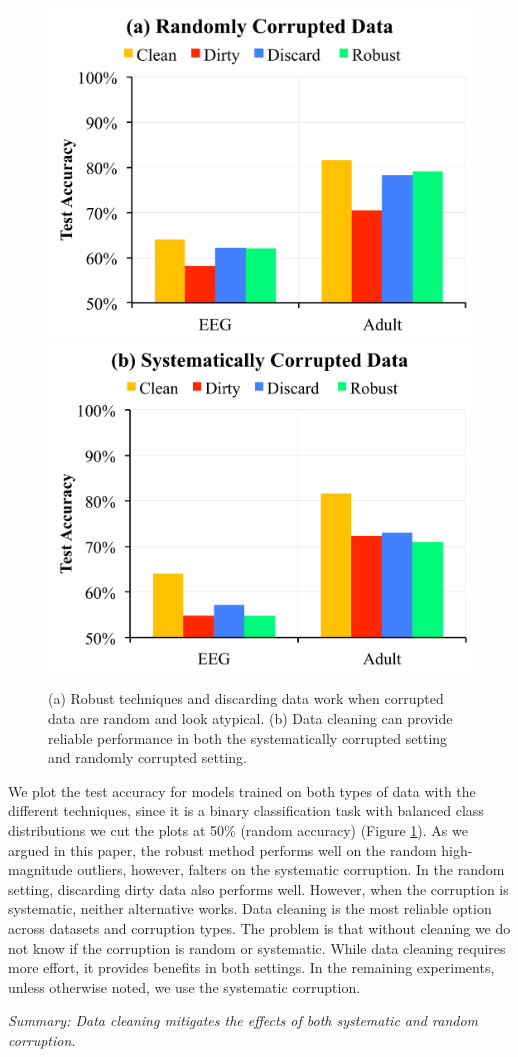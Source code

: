 \begin{figure}[ht!]
\centering
 \includegraphics[width=0.49\columnwidth]{exp/exp2.pdf}
 \includegraphics[width=0.49\columnwidth]{exp/exp1.pdf}
 \caption{(a) Robust techniques and discarding data work when corrupted data are random and look atypical. (b) Data cleaning can provide reliable performance in both the systematically corrupted setting and randomly corrupted setting.\label{sys-rand}}
\end{figure}

We plot the test accuracy for models trained on both types of data with the different techniques, since it is a binary classification task with balanced class distributions we cut the plots at 50\% (random accuracy) (Figure \ref{sys-rand}).
As we argued in this paper, the robust method performs well on the random high-magnitude outliers, however, falters on the systematic corruption.
In the random setting, discarding dirty data also performs well.
However, when the corruption is systematic, neither alternative works.
Data cleaning is the most reliable option across datasets and corruption types.
The problem is that without cleaning we do not know if the corruption is random or systematic.
While data cleaning requires more effort, it provides benefits in both settings.
In the remaining experiments, unless otherwise noted, we use the systematic corruption.

\vspace{0.25em}

\noindent \emph{Summary: Data cleaning mitigates the effects of both systematic and random corruption.}

